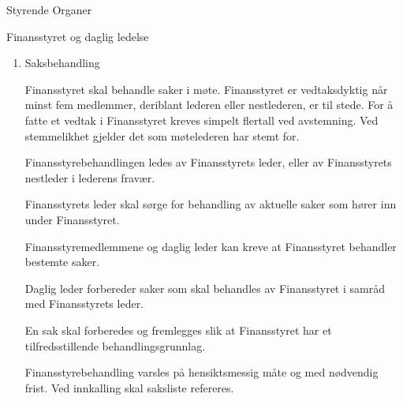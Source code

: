 \documentclass[fsbok.tex]{subfiles}
\begin{document}
\begin{lovkapittel}{Styrende Organer}
\begin{lovparagraf}{Finansstyret og daglig ledelse}
\begin{enumerate}
    Daglig leders underskrift forplikter Studentersamfundet økonomisk, i henhold til instruks gitt av Finansstyret.
    
    Den daglige ledelse omfatter ikke saker som etter Studentersamfundets forhold er av uvanlig art eller stor
    betydning. (Se § 5 Studentersamfundets høyeste myndighet).
    
    Daglig leder kan ellers avgjøre en sak etter fullmakt fra Finansstyret i det enkelte tilfellet, eller når
    Finansstyrets beslutning ikke kan avventes uten vesentlig ulempe for Studentersamfundet. Finansstyret skal
    snarest underrettes om avgjørelsen.
    
    Daglig leder skal sørge for at Studentersamfundets regnskap er i samsvar med lov og forskrifter, og at
    formuesforvaltningen er ordnet på en betryggende måte.
      
    Daglig leder skal minst hver tredje måned, i møte eller skriftlig, gi Finansstyret underretning om
    
    Studentersamfundets virksomhet, stilling og resultatutvikling.
    
    Finansstyret kan til enhver tid kreve at daglig leder gir en nærmere redegjørelse om bestemte saker. Slik
    redegjørelse kan også kreves av det enkelte medlem i Finansstyret.
    
    \item Saksbehandling
    
    Finansstyret skal behandle saker i møte. Finansstyret er vedtaksdyktig når minst fem medlemmer, deriblant
    lederen eller nestlederen, er til stede. For å fatte et vedtak i Finansstyret kreves simpelt flertall ved
    avstemning. Ved stemmelikhet gjelder det som møtelederen har stemt for.
    
    Finansstyrebehandlingen ledes av Finansstyrets leder, eller av Finansstyrets nestleder i lederens fravær.
    
    Finansstyrets leder skal sørge for behandling av aktuelle saker som hører inn under Finansstyret.
    
    Finansstyremedlemmene og daglig leder kan kreve at Finansstyret behandler bestemte saker.
    
    Daglig leder forbereder saker som skal behandles av Finansstyret i samråd med Finansstyrets leder.
    
    En sak skal forberedes og fremlegges slik at Finansstyret har et tilfredsstillende behandlingsgrunnlag.
    
    Finansstyrebehandling varsles på hensiktsmessig måte og med nødvendig frist. Ved innkalling skal saksliste
    refereres.
    

\end{enumerate}
\end{lovparagraf}
\end{lovkapittel}
\end{document}
